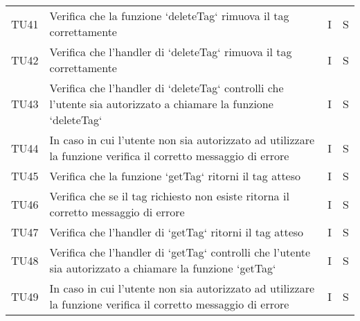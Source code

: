 \begin{center}
\begin{longtable}[!h]{p{45px} p{255px} p{35px} p{35px}}
        TU41          & Verifica che la funzione `deleteTag` rimuova il tag correttamente                                                                                                                                & I              & S              \\
        TU42          & Verifica che l'handler di `deleteTag` rimuova il tag correttamente                                                                                                                               & I              & S              \\
        TU43          & Verifica che l'handler di `deleteTag` controlli che l'utente sia autorizzato a chiamare la funzione `deleteTag`                                                                                  & I              & S              \\
        TU44          & In caso in cui l'utente non sia autorizzato ad utilizzare la funzione verifica il corretto messaggio di errore                                                                                   & I              & S              \\

        TU45          & Verifica che la funzione `getTag` ritorni il tag atteso                                                                                                                                          & I              & S              \\
        TU46          & Verifica che se il tag richiesto non esiste ritorna il corretto messaggio di errore                                                                                                              & I              & S              \\
        TU47          & Verifica che l'handler di `getTag` ritorni il tag atteso                                                                                                                                         & I              & S              \\
        TU48          & Verifica che l'handler di `getTag` controlli che l'utente sia autorizzato a chiamare la funzione `getTag`                                                                                        & I              & S              \\
        TU49          & In caso in cui l'utente non sia autorizzato ad utilizzare la funzione verifica il corretto messaggio di errore                                                                                   & I              & S              \\


\end{longtable}
\end{center}
